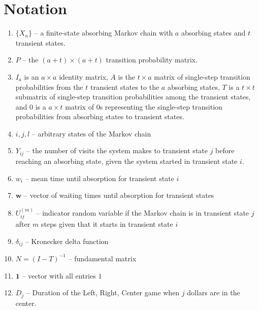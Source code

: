 \documentclass[12pt]{article}
\begin{document}
\section*{Notation}
\begin{enumerate}
    \item
        \( \{ X_n \} \) -- a finite-state absorbing Markov chain with \(
        a \) absorbing states and \( t \) transient states.
    \item
        \( P \) -- the \( (a + t) \times (a + t) \) transition
        probability matrix.
    \item
        \( I_{a} \) is an \( a \times a \) identity matrix, \( A \) is
        the \( t \times a \) matrix of single-step transition
        probabilities from the \( t \) transient states to the \( a \)
        absorbing states, \( T \) is a \( t \times t \) submatrix of
        single-step transition probabilities among the transient states,
        and \( 0 \) is a \( a \times t \) matrix of \( 0 \)s
        representing the single-step transition probabilities from
        absorbing states to transient states.
    \item
        \( i, j, l \) -- arbitrary states of the Markov chain
    \item
        \( Y_{ij} \) -- the number of visits the system makes to
        transient state \( j \) before reaching an absorbing state,
        given the system started in transient state \( i \).
    \item
        \( w_i \) -- mean time until absorption for transient state \( i
        \)
    \item
        \( \mathbf{w} \) -- vector of waiting times until absorption for
        transient states
    \item
        \( U_{ij}^{(m)} \) -- indicator random variable if the Markov
        chain is in transient state \( j \) after \( m \) steps given
        that it starts in transient state \( i \)
    \item
        \( \delta_{ij} \) -- Kronecker delta function
    \item
        \( N = (I-T)^{-1} \) -- fundamental matrix
    \item
        \( \mathbf{1} \) -- vector with all entries \( 1 \)
    \item
        \( D_j \) -- Duration of the Left, Right, Center game when \( j \)
        dollars are in the center.
\end{enumerate}

\end{document}
